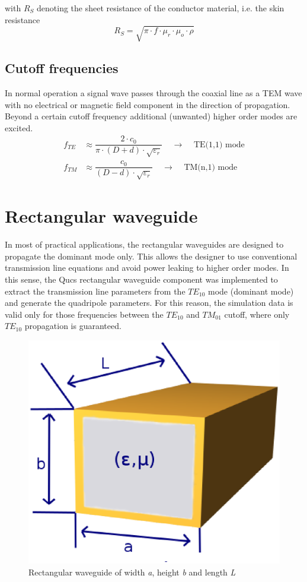 with $R_S$ denoting the sheet resistance of the conductor material,
i.e. the skin resistance
\begin{equation}
R_S = \sqrt{\pi\cdot f\cdot \mu_r \cdot \mu_o \cdot \rho}
\end{equation}

\subsection{Cutoff frequencies}

In normal operation a signal wave passes through the coaxial line as a
TEM wave with no electrical or magnetic field component in the
direction of propagation.  Beyond a certain cutoff frequency
additional (unwanted) higher order modes are excited.
\begin{align}
f_{TE} &\approx \dfrac{2\cdot c_0}{\pi\cdot\left(D + d\right)\cdot\sqrt{\varepsilon_r}}
\;\;\;\;\rightarrow\;\;\;\; \textrm{TE(1,1) mode}\\
f_{TM} &\approx \dfrac{c_0}{\left(D - d\right)\cdot\sqrt{\varepsilon_r}}
\;\;\;\;\rightarrow\;\;\;\; \textrm{TM(n,1) mode}
\end{align}

\section{Rectangular waveguide}
\label{sec:rectWG}

In most of practical applications, the rectangular waveguides are designed to propagate the dominant mode only. This allows the designer to use conventional transmission line equations and avoid power leaking to higher order modes. In this sense, the Qucs rectangular waveguide component was implemented to extract the transmission line parameters from the $TE_{10}$ mode (dominant mode) and generate the quadripole parameters. For this reason, the simulation data is valid only for those frequencies between the $TE_{10}$ and $TM_{01}$ cutoff, where only $TE_{10}$ propagation is guaranteed.


\begin{figure}[H]
\begin{center}
\includegraphics[width=0.5\linewidth]{rectwaveguide}
\end{center}
\caption{Rectangular waveguide of width \textit{a}, height \textit{b} and length \textit{L}}
\label{fig:rectwg}
\end{figure}


